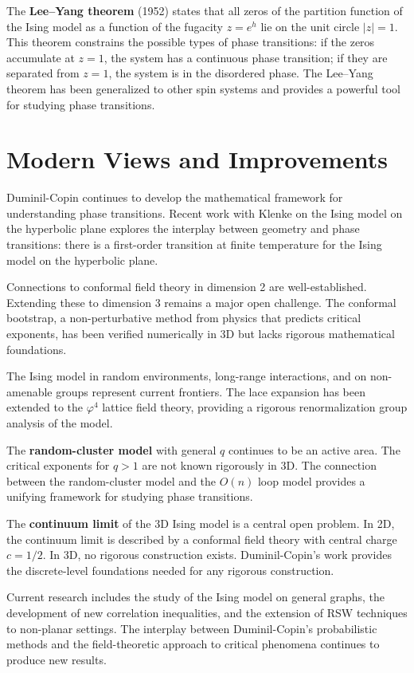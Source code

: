 The \textbf{Lee--Yang theorem} (1952) states that all zeros of the partition function of the Ising model as a function of the fugacity $z = e^{h}$ lie on the unit circle $|z|=1$. This theorem constrains the possible types of phase transitions: if the zeros accumulate at $z=1$, the system has a continuous phase transition; if they are separated from $z=1$, the system is in the disordered phase. The Lee--Yang theorem has been generalized to other spin systems and provides a powerful tool for studying phase transitions.

\section{Modern Views and Improvements}

Duminil-Copin continues to develop the mathematical framework for understanding phase transitions. Recent work with Klenke on the Ising model on the hyperbolic plane explores the interplay between geometry and phase transitions: there is a first-order transition at finite temperature for the Ising model on the hyperbolic plane.

Connections to conformal field theory in dimension 2 are well-established. Extending these to dimension 3 remains a major open challenge. The conformal bootstrap, a non-perturbative method from physics that predicts critical exponents, has been verified numerically in 3D but lacks rigorous mathematical foundations.

The Ising model in random environments, long-range interactions, and on non-amenable groups represent current frontiers. The lace expansion has been extended to the $\varphi^4$ lattice field theory, providing a rigorous renormalization group analysis of the model.

The \textbf{random-cluster model} with general $q$ continues to be an active area. The critical exponents for $q > 1$ are not known rigorously in 3D. The connection between the random-cluster model and the $O(n)$ loop model provides a unifying framework for studying phase transitions.

The \textbf{continuum limit} of the 3D Ising model is a central open problem. In 2D, the continuum limit is described by a conformal field theory with central charge $c = 1/2$. In 3D, no rigorous construction exists. Duminil-Copin's work provides the discrete-level foundations needed for any rigorous construction.

Current research includes the study of the Ising model on general graphs, the development of new correlation inequalities, and the extension of RSW techniques to non-planar settings. The interplay between Duminil-Copin's probabilistic methods and the field-theoretic approach to critical phenomena continues to produce new results.

